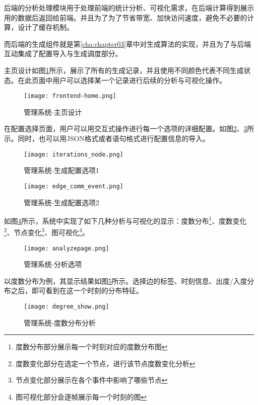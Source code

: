 后端的分析处理模块用于处理前端的统计分析、可视化需求，在后端计算得到展示用的数据后返回给前端。并且为了为了节省带宽、加快访问速度，避免不必要的计算，设计了缓存机制。

而后端的生成组件就是第\ref{cha:chapter03}章中对生成算法的实现，并且为了与后端互动集成了配置导入与生成调度部分。

主页设计如图\ref{fig:frontend-home}所示，展示了所有的生成记录，并且使用不同颜色代表不同生成状态。在此页面中用户可以选择某一个记录进行后续的分析与可视化操作。

\begin{figure}[H]
  \centering
  \texttt{[image: frontend-home.png]}
  \caption{管理系统-主页设计}
  \label{fig:frontend-home}
\end{figure}

在配置选择页面，用户可以用交互式操作进行每一个选项的详细配置。如图\ref{fig:iterations_node}、\ref{fig:edge_comm_event}所示。同时，也可以用JSON格式或者语句格式进行配置信息的导入。

\begin{figure}[H]
  \centering
  \texttt{[image: iterations\_node.png]}
  \caption{管理系统-生成配置选项1}
  \label{fig:iterations_node}
\end{figure}

\begin{figure}[H]
  \centering
  \texttt{[image: edge\_comm\_event.png]}
  \caption{管理系统-生成配置选项2}
  \label{fig:edge_comm_event}
\end{figure}

如图\ref{fig:analyzepage}所示，系统中实现了如下几种分析与可视化的显示：度数分布\footnote{度数分布部分展示每一个时刻对应的度数分布图}、度数变化\footnote{度数变化部分在选定一个节点，进行该节点度数变化分析}、节点变化\footnote{节点变化部分展示在各个事件中影响了哪些节点}、图可视化\footnote{图可视化部分会逐帧展示每一个时刻的图}。

\begin{figure}[H]
  \centering
  \texttt{[image: analyzepage.png]}
  \caption{管理系统-分析选项}
  \label{fig:analyzepage}
\end{figure}

以度数分布为例，其显示结果如图\ref{fig:degree_show}所示。选择边的标签、时刻信息、出度/入度分布之后，即可看到在这一个时刻的分布特征。

\begin{figure}[H]
  \centering
  \texttt{[image: degree\_show.png]}
  \caption{管理系统-度数分布分析}
  \label{fig:degree_show}
\end{figure}

